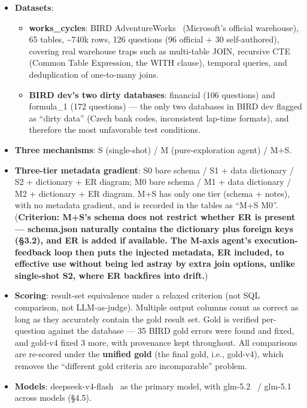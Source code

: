 \documentclass[11pt]{article}
\begin{document}
\begin{itemize}
\item
  \textbf{Datasets}:

  \begin{itemize}
  \item
    \textbf{works\_cycles}: BIRD AdventureWorks~\cite{adventureworks} (Microsoft's official warehouse), 65 tables, \textasciitilde740k rows, 126 questions (96 official + 30 self-authored), covering real warehouse traps such as multi-table JOIN, recursive CTE (Common Table Expression, the WITH clause), temporal queries, and deduplication of one-to-many joins.
  \item
    \textbf{BIRD dev's two dirty databases}: financial (106 questions) and formula\_1 (172 questions) --- the only two databases in BIRD dev flagged as ``dirty data'' (Czech bank codes, inconsistent lap-time formats), and therefore the most unfavorable test conditions.
  \end{itemize}
\item
  \textbf{Three mechanisms}: S (single-shot) / M (pure-exploration agent) / M+S.
\item
  \textbf{Three-tier metadata gradient}: S0 bare schema / S1 + data dictionary / S2 + dictionary + ER diagram; M0 bare schema / M1 + data dictionary / M2 + dictionary + ER diagram. M+S has only one tier (schema + notes), with no metadata gradient, and is recorded in the tables as ``M+S M0''. (\textbf{Criterion: M+S's schema does not restrict whether ER is present --- schema.json naturally contains the dictionary plus foreign keys (\S{}3.2), and ER is added if available. The M-axis agent's execution-feedback loop then puts the injected metadata, ER included, to effective use without being led astray by extra join options, unlike single-shot S2, where ER backfires into drift.})
\item
  \textbf{Scoring}: result-set equivalence under a relaxed criterion (not SQL comparison, not LLM-as-judge). Multiple output columns count as correct as long as they accurately contain the gold result set. Gold is verified per-question against the database --- 35 BIRD gold errors were found and fixed, and gold-v4 fixed 3 more, with provenance kept throughout. All comparisons are re-scored under the \textbf{unified gold} (the final gold, i.e., gold-v4), which removes the ``different gold criteria are incomparable'' problem.
\item
  \textbf{Models}: deepseek-v4-flash~\cite{deepseek-v4} as the primary model, with glm-5.2~\cite{glm5} / glm-5.1 across models (\S{}4.5).
\end{itemize}
\end{document}
